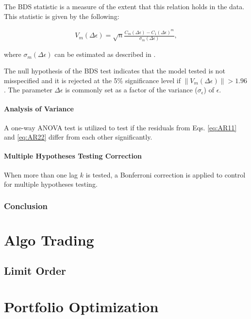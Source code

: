 \documentclass[]{book}
\theoremstyle{definition}
\theoremstyle{definition}
\theoremstyle{definition}
\theoremstyle{remark}
\begin{document}
The BDS statistic is a measure of the extent that this relation holds in
the data. This statistic is given by the following:

\begin{align}
V_{m}(\Delta \epsilon) = \sqrt{n}\frac{C_{m}(\Delta \epsilon) - C_{1}(\Delta \epsilon)^m}{\sigma_m(\Delta \epsilon)}, \nonumber
\end{align}

where \(\sigma_m(\Delta \epsilon)\) can be estimated as described in
\citep{citeulike:9300127}.

The null hypothesis of the BDS test indicates that the model tested is
not misspecified and it is rejected at the 5\% significance level if
\(\|V_m(\Delta \epsilon)\| > 1.96\). The parameter \(\Delta \epsilon\)
is commonly set as a factor of the variance (\(\sigma_\epsilon\)) of
\(\epsilon\).

\subsection{Analysis of Variance}\label{analysis-of-variance}

A one-way ANOVA test is utilized to test if the residuals from Eqs.
\eqref{eq:AR11} and \eqref{eq:AR22} differ from each other significantly.

\subsection{Multiple Hypotheses Testing
Correction}\label{multiple-hypotheses-testing-correction}

When more than one lag \(k\) is tested, a Bonferroni correction is
applied to control for multiple hypotheses testing.

\section{Conclusion}\label{conclusion-1}

\part{Algo Trading}\label{part-algo-trading}

\chapter{Limit Order}\label{limit-order}

\part{Portfolio
Optimization}\label{part-portfolio-optimization}
\end{document}
